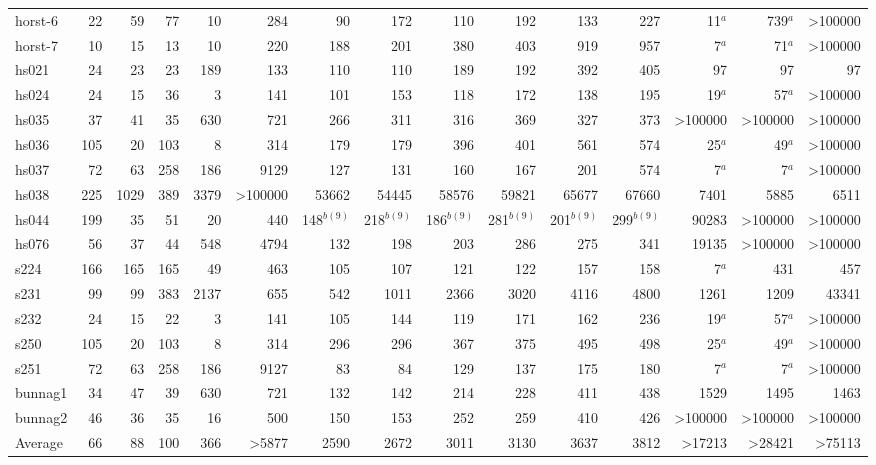 \begin{landscape}
\begin{table}[htbp]
\begin{tabular}{lrrrrrrrrrrrrrr}
horst-6  & 22 & 59 & 77 & 10 & 284 & 90 & 172 & 110 & 192 & 133 & 227 & 11$^a$ & 739$^a$ & >100000 \\[0.05cm]
horst-7  & 10 & 15 & 13 & 10 & 220 & 188 & 201 & 380 & 403 & 919 & 957 & 7$^a$ & 71$^a$ & >100000 \\[0.05cm]
hs021  & 24 & 23 & 23 & 189 & 133 & 110 & 110 & 189 & 192 & 392 & 405 & 97 & 97 & 97 \\[0.05cm]
hs024  & 24 & 15 & 36 & 3 & 141 & 101 & 153 & 118 & 172 & 138 & 195 & 19$^a$ & 57$^a$ & >100000 \\[0.05cm]
hs035  & 37 & 41 & 35 & 630 & 721 & 266 & 311 & 316 & 369 & 327 & 373 & >100000 & >100000 & >100000 \\[0.05cm]
hs036  & 105 & 20 & 103 & 8 & 314 & 179 & 179 & 396 & 401 & 561 & 574 & 25$^a$ & 49$^a$ & >100000 \\[0.05cm]
hs037  & 72 & 63 & 258 & 186 & 9129 & 127 & 131 & 160 & 167 & 201 & 574 & 7$^a$ & 7$^a$ & >100000 \\[0.05cm]
hs038  & 225 & 1029 & 389 & 3379 & >100000 & 53662 & 54445 & 58576 & 59821 & 65677 & 67660 & 7401 & 5885 & 6511 \\[0.05cm]
hs044  & 199 & 35 & 51 & 20 & 440 & 148$^{b(9)}$ & 218$^{b(9)}$ & 186$^{b(9)}$ & 281$^{b(9)}$ & 201$^{b(9)}$ & 299$^{b(9)}$ & 90283 & >100000 & >100000 \\[0.05cm]
hs076  & 56 & 37 & 44 & 548 & 4794 & 132 & 198 & 203 & 286 & 275 & 341 & 19135 & >100000 & >100000 \\[0.05cm]
s224  & 166 & 165 & 165 & 49 & 463 & 105 & 107 & 121 & 122 & 157 & 158 & 7$^a$ & 431 & 457 \\[0.05cm]
s231  & 99 & 99 & 383 & 2137 & 655 & 542 & 1011 & 2366 & 3020 & 4116 & 4800 & 1261 & 1209 & 43341 \\[0.05cm]
s232 & 24 & 15 & 22 & 3 & 141 & 105 & 144 & 119 & 171 & 162 & 236 & 19$^a$ & 57$^a$ & >100000 \\[0.05cm]
s250 & 105 & 20  & 103 & 8 & 314 & 296 & 296 & 367 & 375 & 495 & 498 & 25$^a$ & 49$^a$ & >100000 \\[0.05cm]
s251 & 72 & 63 & 258 & 186 & 9127 & 83 & 84 & 129 & 137 & 175 & 180 & 7$^a$ & 7$^a$ & >100000 \\[0.05cm]
bunnag1  & 34 & 47 & 39 & 630 & 721 & 132 & 142 & 214 & 228 & 411 & 438 & 1529 & 1495 & 1463 \\[0.05cm]
bunnag2  & 46 & 36 & 35 & 16 & 500 & 150 & 153 & 252 & 259 & 410 & 426 & >100000 & >100000 & >100000 \\[0.05cm]
\cmidrule(lr){2-15}
Average  & 66 & 88 & 100 & 366 & >5877 & 2590 & 2672 & 3011 & 3130 & 3637 & 3812 & >17213 & >28421 & >75113 \\[0.05cm]

\end{tabular}
\end{table}
\end{landscape}
